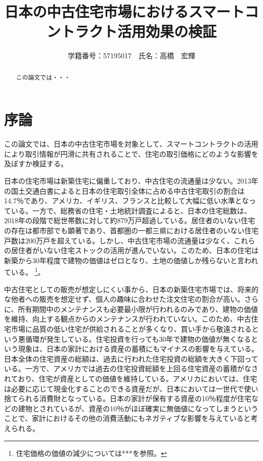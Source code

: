 \documentclass[a4paper,10.5pt]{bxjsarticle}
\title{日本の中古住宅市場におけるスマートコントラクト活用効果の検証}
\author{学籍番号：57195017　氏名：高橋　宏輝}
\begin{document}
\maketitle
\begin{abstract}
この論文では・・・
\end{abstract}

\tableofcontents

\section{序論}
この論文では、日本の中古住宅市場を対象として、スマートコントラクトの活用により取引情報が円滑に共有されることで、住宅の取引価格にどのような影響を及ぼすか検証する。

日本の住宅市場は新築住宅に偏重しており、中古住宅の流通量は少ない。2013年の国土交通白書によると日本の住宅取引全体に占める中古住宅取引の割合は14.7％であり、アメリカ、イギリス、フランスと比較して大幅に低い水準となっている。一方で、総務省の住宅・土地統計調査によると、日本の住宅総数は、2018年の段階で総世帯数に対して約879万戸超過している。居住者のいない住宅の存在は都市部でも顕著であり、首都圏の一都三県における居住者のいない住宅戸数は200万戸を超えている。しかし、中古住宅市場の流通量は少なく、これらの居住者がいない住宅ストックの活用が進んでいない。このため、日本の住宅は新築から30年程度で建物の価値はゼロとなり、土地の価値しか残らないと言われている。
\footnote{
\label{this_footnote}
住宅価格の価値の減少については***を参照。
}。

中古住宅としての販売が想定しにくい事から、日本の新築住宅市場では、将来的な他者への販売を想定せず、個人の趣味に合わせた注文住宅の割合が高い。さらに、所有期間中のメンテナンスも必要最小限が行われるのみであり、建物の価値を維持、向上する観点からのメンテナンスが行われていない。このため、中古住宅市場に品質の低い住宅が供給されることが多くなり、買い手から敬遠されるという悪循環が発生している。住宅投資を行っても30年で建物の価値が無くなるという現象は、日本の家計における資産の蓄積にもマイナスの影響を与えている。
日本全体の住宅資産の総額は、過去に行われた住宅投資の総額を大きく下回っている。一方で、アメリカでは過去の住宅投資総額を上回る住宅資産の蓄積がなされており、住宅が資産としての価値を維持している。アメリカにおいては、住宅は必要に応じて現金化することのできる資産だが、日本においては一世代で使い捨てられる消費財となっている。日本の家計が保有する資産の10％程度が住宅などの建物とされているが、資産の10％がほぼ確実に無価値になってしまうということで、家計におけるその他の消費活動にもネガティブな影響を与えていると考えられる。
\end{document}
